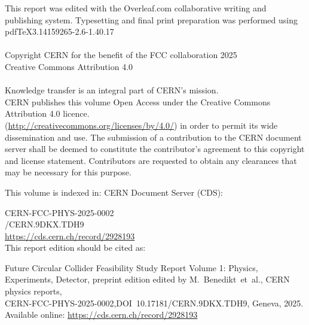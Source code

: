 \noindent This report was edited with the Overleaf.com collaborative writing and publishing system. Typesetting and final print preparation was performed using pdf\TeX 3.14159265-2.6-1.40.17\\
\\
\noindent Copyright CERN for the benefit of the FCC collaboration 2025\\
Creative Commons Attribution 4.0\\
\\
Knowledge transfer is an integral part of CERN's mission.\\
CERN publishes this volume Open Access under the Creative Commons Attribution 4.0 licence.\\ (\mbox{\url{http://creativecommons.org/licenses/by/4.0/}}) in order to permit its wide dissemination and use.
The submission of a contribution to the CERN document server shall be deemed to constitute the contributor's agreement to this copyright and license statement. Contributors are requested to obtain any clearances that may be necessary for this purpose.

\bigskip
\noindent This volume is indexed in: CERN Document Server (CDS):

\smallskip
\noindent CERN-FCC-PHYS-2025-0002\\
/CERN.9DKX.TDH9\\
\noindent \url{https://cds.cern.ch/record/2928193}\\

\bigskip
\noindent This report edition should be cited as:

\smallskip
\noindent Future Circular Collider Feasibility Study Report Volume 1: Physics, Experiments, Detector, preprint edition edited by \mbox{M.~Benedikt et al.}, CERN physics reports,\\
\mbox{CERN-FCC-PHYS-2025-0002},\mbox{DOI 10.17181/CERN.9DKX.TDH9}, Geneva, 2025.\\
\noindent Available online: \url{https://cds.cern.ch/record/2928193}
\clearpage


